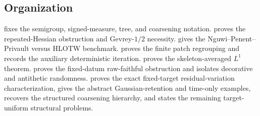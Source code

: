 \subsection{Organization}

 fixes the semigroup, signed-measure, tree, and coarsening notation.  proves the repeated-Hessian obstruction and Gevrey-$1/2$ necessity.  gives the Nguwi--Penent--Privault versus HLOTW benchmark.  proves the finite patch regrouping and records the auxiliary deterministic iteration.  proves the skeleton-averaged $L^1$ theorem.  proves the fixed-datum raw-faithful obstruction and isolates decorative and antithetic randomness.  proves the exact fixed-target residual-variation characterization, gives the abstract Gaussian-retention and time-only examples, recovers the structured coarsening hierarchy, and states the remaining target-uniform structural problems.
